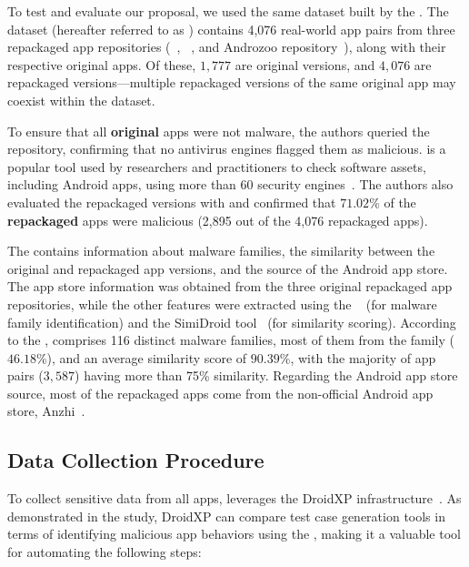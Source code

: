 To test and evaluate our proposal, we used the same dataset built by the \fhc. The dataset (hereafter referred to as \cds) contains 4,076 real-world app pairs from three repackaged app repositories (\repack~\cite{DBLP:journals/tse/LiBK21}, \amc~\cite{rafiq2022andromalpack}, and Androzoo repository~\cite{DBLP:conf/msr/AllixBKT16}), along with their respective original apps. Of these, $1,777$ are original versions, and $4,076$ are repackaged versions---multiple repackaged versions of the same original app may coexist within the \cds dataset.

To ensure that all {\bf original} apps were not malware, the authors queried the \vt repository, confirming that no antivirus engines flagged them as malicious. \vt is a popular tool used by researchers and practitioners to check software assets, including Android apps, using more than 60 security engines~\cite{DBLP:journals/ese/KhanmohammadiEH19}. The authors also evaluated the repackaged versions with \vt and confirmed that $71.02$\% of the {\bf repackaged} apps were malicious (2,895 out of the 4,076 repackaged apps).

The \cds contains information about malware families, the similarity between the original and repackaged app versions, and the source of the Android app store. The app store information was obtained from the three original repackaged app repositories, while the other features were extracted using the \avt~\cite{avclass2-paper} (for malware family identification) and the SimiDroid tool~\cite{DBLP:conf/trustcom/0029BK17} (for similarity scoring). According to the \fhc, \cds comprises 116 distinct malware families, most of them from the \gps family ($46.18$\%), and an average similarity score of $90.39$\%, with the majority of app pairs ($3,587$) having more than 75\% similarity. Regarding the Android app store source, most of the repackaged apps come from the non-official Android app store, Anzhi~\cite{anzhi}.



\subsection{\mas Data Collection Procedure}\label{sec:mas}


To collect sensitive data from all apps, \fhc leverages the DroidXP infrastructure~\cite{DBLP:conf/scam/CostaMCMVBC20}. As demonstrated in the study, DroidXP can compare test case generation tools in terms of identifying malicious app behaviors using the \mas, making it a valuable tool for automating the following steps:


